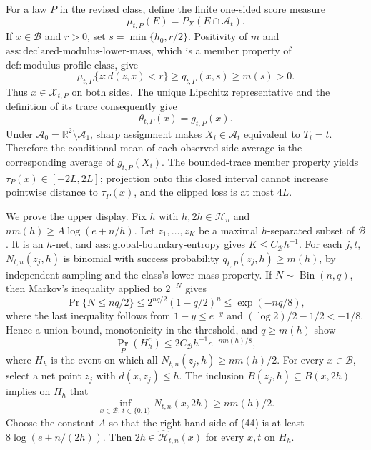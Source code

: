 For a law \(P\) in the revised class, define the finite one-sided score measure
\[
 \mu_{t,P}(E)=P_X(E\cap\mathcal A_t).
\]
If \(x\in\mathcal B\) and \(r>0\), set \(s=\min\{h_0,r/2\}\). Positivity of \(m\) and \(\mathrm{ass:declared\text{-}modulus\text{-}lower\text{-}mass}\), which is a member property of \(\mathrm{def:modulus\text{-}profile\text{-}class}\), give
\[
 \mu_{t,P}\{z:d(z,x)<r\}\ge q_{t,P}(x,s)\ge m(s)>0. \tag{40}
\]
Thus \(x\in\mathcal X_{t,P}\) on both sides. The unique Lipschitz representative and the definition of its trace consequently give
\[
 \theta_{t,P}(x)=g_{t,P}(x). \tag{41}
\]
Under \(\mathcal A_0=\mathbb R^2\setminus\mathcal A_1\), sharp assignment makes \(X_i\in\mathcal A_t\) equivalent to \(T_i=t\). Therefore the conditional mean of each observed side average is the corresponding average of \(g_{t,P}(X_i)\). The bounded-trace member property yields \(\tau_P(x)\in[-2L,2L]\); projection onto this closed interval cannot increase pointwise distance to \(\tau_P(x)\), and the clipped loss is at most \(4L\).

We prove the upper display. Fix \(h\) with \(h,2h\in\mathcal H_n\) and \(nm(h)\ge A\log(e+n/h)\). Let \(z_1,\ldots,z_K\) be a maximal \(h\)-separated subset of \(\mathcal B\). It is an \(h\)-net, and \(\mathrm{ass:global\text{-}boundary\text{-}entropy}\) gives \(K\le C_{\mathcal B}h^{-1}\). For each \(j,t\), \(N_{t,n}(z_j,h)\) is binomial with success probability \(q_{t,P}(z_j,h)\ge m(h)\), by independent sampling and the class's lower-mass property. If \(N\sim\operatorname{Bin}(n,q)\), then Markov's inequality applied to \(2^{-N}\) gives
\[
 \Pr\{N\le nq/2\}
 \le 2^{nq/2}(1-q/2)^n
 \le \exp(-nq/8), \tag{42}
\]
where the last inequality follows from \(1-y\le e^{-y}\) and \((\log2)/2-1/2<-1/8\). Hence a union bound, monotonicity in the threshold, and \(q\ge m(h)\) show
\[
 \Pr_P(H_h^c)\le 2C_{\mathcal B}h^{-1}e^{-nm(h)/8}, \tag{43}
\]
where \(H_h\) is the event on which all \(N_{t,n}(z_j,h)\ge nm(h)/2\). For every \(x\in\mathcal B\), select a net point \(z_j\) with \(d(x,z_j)\le h\). The inclusion \(B(z_j,h)\subseteq B(x,2h)\) implies on \(H_h\) that
\[
 \inf_{x\in\mathcal B,\,t\in\{0,1\}}N_{t,n}(x,2h)\ge nm(h)/2. \tag{44}
\]
Choose the constant \(A\) so that the right-hand side of (44) is at least \(8\log(e+n/(2h))\). Then \(2h\in\widehat{\mathcal H}_{t,n}(x)\) for every \(x,t\) on \(H_h\).

